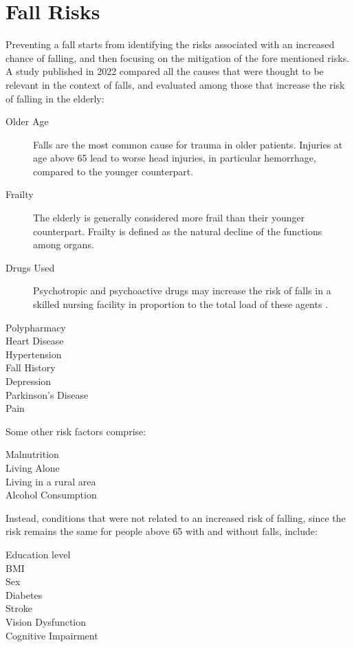 \section{Fall Risks}
Preventing a fall starts from identifying the risks associated with an increased chance of falling, and then focusing on the mitigation of the fore mentioned risks.
A study published in 2022 \cite{RiskFactors} compared all the causes that were thought to be relevant in the context of falls, and evaluated among those that increase the risk of falling in the elderly:
\begin{description}
   \item[Older Age] Falls are the most common cause for trauma in older patients. Injuries at age above 65 lead to worse head injuries, in particular hemorrhage, compared to the younger counterpart\cite{geriatricTrauma}.
   \item[Frailty] The elderly is generally considered more frail than their younger counterpart. Frailty is defined as the natural decline of the functions among organs\cite{geriatricTrauma}.
   \item[Drugs Used] Psychotropic and psychoactive drugs may increase the risk of falls in a skilled nursing facility in proportion to the total load of these agents \cite{drugsEffects}.
   \item[Polypharmacy]
   \item[Heart Disease]
   \item[Hypertension]
   \item[Fall History]
   \item[Depression]
   \item[Parkinson's Disease]
   \item[Pain]
\end{description}

Some other risk factors comprise:
\begin{description}
  \item[Malnutrition]
  \item[Living Alone]
  \item[Living in a rural area]
  \item[Alcohol Consumption]
\end{description}

Instead, conditions that were not related to an increased risk of falling, since the risk remains the same for people above 65 with and without falls, include:
\begin{description}
  \item[Education level]
  \item[BMI]
  \item[Sex]
  \item[Diabetes]
  \item[Stroke]
  \item[Vision Dysfunction]
  \item[Cognitive Impairment]
\end{description}

